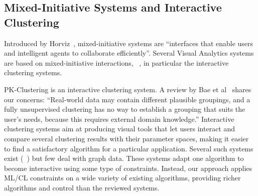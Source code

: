 \begin{revs}
\subsection{Mixed-Initiative Systems and Interactive Clustering}

Introduced by Horviz~\cite{Horvitz99}, mixed-initiative systems are ``interfaces that enable users and intelligent agents to collaborate efficiently''. Several Visual Analytics systems are based on mixed-initiative interactions, \eg~\cite{makonin16, cook15, zhou13, wall18}, in particular the interactive clustering systems.

PK-Clustering is an interactive clustering system. A review by Bae et al~\cite{baeetal20} shares our concerns:
``Real-world data may contain different plausible groupings, and a fully unsupervised clustering has no way to establish a grouping that suits the user’s needs, because this requires external domain knowledge.''
Interactive clustering systems aim at producing visual tools that let users interact and compare several clustering results with their parameter spaces, making it easier to find a satisfactory algorithm for a particular application. Several such systems exist (\eg~\cite{cavallo2018clustrophile, l2015xclusim}) but few deal with graph data.
These systems adapt one algorithm to become interactive using some type of constraints.
Instead, our approach applies ML/CL constraints on a wide variety of existing algorithms, providing richer algorithms and control than the reviewed systems.

\end{revs}


